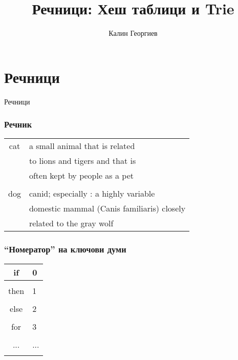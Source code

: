 \documentclass{beamer}
\begin{document}
\title[Структури от данни и програмиране]{Речници: Хеш таблици и Trie} 
\author{Калин Георгиев} 
\frame{\titlepage} 

\section{Речници} 


\begin{frame}
\centerline{Речници}
\end{frame}


\begin{frame}[fragile]
\frametitle{Речник}
\begin{center}
\begin{tabular} {c | l}
  cat & a small animal that is related \\
      & to lions and tigers and that is \\
      & often kept by people as a pet \\
      \hline\\
  dog & canid; especially :  a highly variable \\
      & domestic mammal (Canis familiaris) closely \\
      & related to the gray wolf
\end{tabular}  
\end{center}
\end{frame}

\begin{frame}[fragile]
\frametitle{``Номератор'' на ключови думи}
\begin{center}
\begin{tabular} {c | l}
  if & 0 \\
      \hline\\
  then & 1 \\
      \hline\\
  else & 2 \\
      \hline\\
  for & 3 \\
      \hline\\
  ... & ... \\
      \hline\\
\end{tabular}  
\end{center}
\end{frame}
\end{document}
